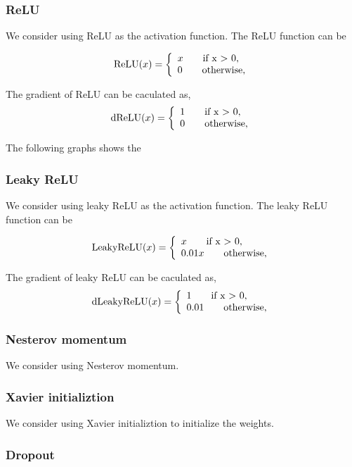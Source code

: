 \documentclass{article} %
\begin{document}
\subsubsection{ReLU}
We consider using ReLU as the activation function. The ReLU function can be 

\[
\textnormal{ReLU}(x) =\left\{
\begin{array}{ll}
x \qquad \textnormal{if x $>$ 0,}\\
0 \qquad \textnormal{otherwise,}
\end{array}
\right.
\]

The gradient of ReLU can be caculated as,
 \[
\textnormal{dReLU}(x) =\left\{
\begin{array}{ll}
1 \qquad \textnormal{if x $>$ 0,}\\
0 \qquad \textnormal{otherwise,}
\end{array}
\right.
\]



The following graphs shows the 


\subsubsection{Leaky ReLU}

We consider using leaky ReLU as the activation function. The leaky ReLU function can be 

\[
\textnormal{LeakyReLU}(x) =\left\{
\begin{array}{ll}
x \qquad \textnormal{if x $>$ 0,}\\
0.01x \qquad \textnormal{otherwise,}
\end{array}
\right.
\]

The gradient of leaky ReLU can be caculated as,
\[
\textnormal{dLeakyReLU}(x) =\left\{
\begin{array}{ll}
1 \qquad \textnormal{if x $>$ 0,}\\
0.01 \qquad \textnormal{otherwise,}
\end{array}
\right.
\]
\subsubsection{Nesterov momentum}
We consider using Nesterov momentum.

\subsubsection{Xavier initializtion}
We consider using Xavier initializtion to initialize the weights.


\subsubsection{Dropout}
\end{document}
